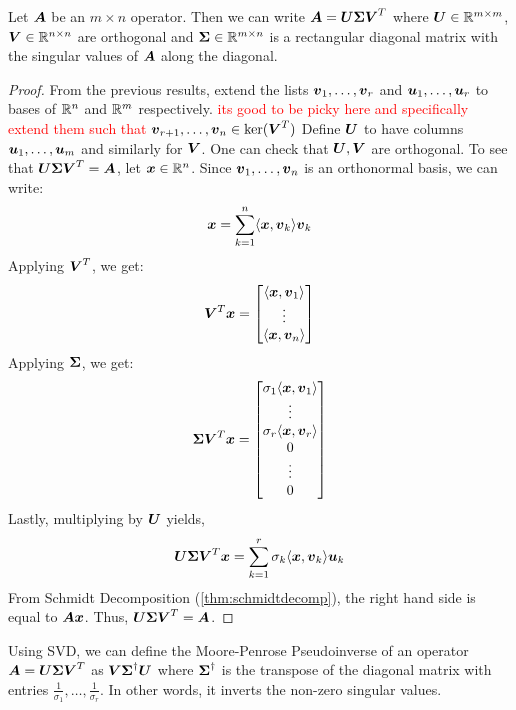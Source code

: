 \begin{theorem}\label{thm:svd}
    Let $\boldsymbol{A}$ be an $m\times n$ operator. Then we can write $\boldsymbol{A}=\boldsymbol{U}\boldsymbol{\Sigma}{\boldsymbol{V}}^T$ where $\boldsymbol{U}\in \mathbb{R}^{m\times m}$, $\boldsymbol{V}\in\mathbb{R}^{n\times n}$ are orthogonal and $\boldsymbol{\Sigma}\in\mathbb{R}^{m\times n}$ is a rectangular diagonal matrix with the singular values of $\boldsymbol{A}$ along the diagonal.
\end{theorem}

\begin{proof}
    From the previous results, extend the lists $\boldsymbol{v}_1,\dots,\boldsymbol{v}_r$ and $\boldsymbol{u}_1,\dots,\boldsymbol{u}_r$ to bases of $\mathbb{R}^n$ and $\mathbb{R}^m$ respectively. \textcolor{red}{its good to be picky here and specifically extend them such that $\boldsymbol{v}_{r+1},\dots,\boldsymbol{v}_n\in\ker(\boldsymbol{V}^T)$} Define $\boldsymbol{U}$ to have columns $\boldsymbol{u}_1,\dots,\boldsymbol{u}_m$ and similarly for $\boldsymbol{V}$. One can check that $\boldsymbol{U},\boldsymbol{V}$ are orthogonal. To see that $\boldsymbol{U}\boldsymbol{\Sigma}\boldsymbol{V}^T=\boldsymbol{A}$, let $\boldsymbol{x}\in\mathbb{R}^n$. Since $\boldsymbol{v}_1,\dots,\boldsymbol{v}_n$ is an orthonormal basis, we can write:
    \[
    \boldsymbol{x}=\sum_{k=1}^n\langle\boldsymbol{x},\boldsymbol{v}_k\rangle\boldsymbol{v}_k
    \]
    Applying $\boldsymbol{V}^T$, we get:
    \[
    \boldsymbol{V}^T\boldsymbol{x}=\begin{bmatrix}
        \langle\boldsymbol{x},\boldsymbol{v}_1\rangle \\
        \vdots \\
        \langle\boldsymbol{x},\boldsymbol{v}_n\rangle
    \end{bmatrix}
    \]
    Applying $\boldsymbol{\Sigma}$, we get:
    \[
    \boldsymbol{\Sigma}\boldsymbol{V}^T\boldsymbol{x}=\begin{bmatrix}
        \sigma_1\langle\boldsymbol{x},\boldsymbol{v}_1\rangle \\
        \vdots \\
        \sigma_r\langle\boldsymbol{x},\boldsymbol{v}_r\rangle \\
        0 \\
        \vdots \\
        0
    \end{bmatrix}
    \]
    Lastly, multiplying by $\boldsymbol{U}$ yields,
    \[
    \boldsymbol{U}\boldsymbol{\Sigma}\boldsymbol{V}^T\boldsymbol{x}=\sum_{k=1}^r\sigma_k\langle\boldsymbol{x},\boldsymbol{v}_k\rangle\boldsymbol{u}_k
    \]
    From Schmidt Decomposition (\ref{thm:schmidtdecomp}), the right hand side is equal to $\boldsymbol{A}\boldsymbol{x}$. Thus, $\boldsymbol{U}\boldsymbol{\Sigma}\boldsymbol{V}^T=\boldsymbol{A}$.
\end{proof}
Using SVD, we can define the Moore-Penrose Pseudoinverse of an operator $\boldsymbol{A}=\boldsymbol{U}\boldsymbol{\Sigma}\boldsymbol{V}^T$ as $\boldsymbol{V}\boldsymbol{\Sigma}^{\dagger}\boldsymbol{U}$ where $\boldsymbol{\Sigma}^{\dagger}$ is the transpose of the diagonal matrix with entries $\frac{1}{\sigma_1},\dots,\frac{1}{\sigma_r}$. In other words, it inverts the non-zero singular values.

